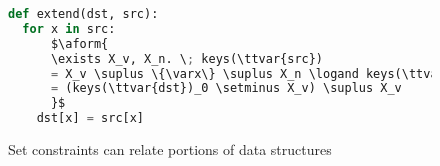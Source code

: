 \begin{figure}[tb]
  \centering
    \begin{lstlisting}[language=python,mathescape=true]
def extend(dst, src):
  for x in src:
      $\aform{
      \exists X_v, X_n. \; keys(\ttvar{src})
      = X_v \suplus \{\varx\} \suplus X_n \logand keys(\ttvar{dst})
      = (keys(\ttvar{dst})_0 \setminus X_v) \suplus X_v
      }$
    dst[x] = src[x]
    \end{lstlisting}
  \caption{Set constraints can relate portions of data structures}
  \label{fig:intro-example} \label{f:1:intro}
\end{figure}

